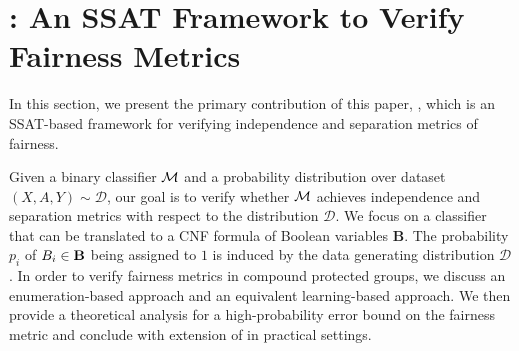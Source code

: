 \section{{\justicia}: An SSAT Framework to Verify Fairness Metrics}
\label{fairness_justicia_sec:framework}
In this section, we present the primary contribution of this paper, {\justicia}, which is an SSAT-based framework for verifying independence and separation metrics of fairness. 

Given a binary classifier $\alg$ and a probability distribution over dataset $(X,A,Y) \sim \mathcal{D} $, our goal is to verify whether $\alg$ achieves independence and separation metrics with respect to the distribution $\mathcal{D}$. We  focus on a classifier that can be translated to a CNF formula of Boolean variables $\mathbf{B} $. 
The probability $ p_i $ of $\bool_i \in \mathbf{B}$ being assigned to $1$ is induced by the data generating distribution $\mathcal{D}$. 
In order to verify fairness metrics in compound protected groups, we discuss an enumeration-based approach and an equivalent learning-based approach. 
We then provide a theoretical analysis for a high-probability error bound on the fairness metric and conclude with extension of {\justicia} in practical settings.

\iffalse
In this section, we present the main contribution of this paper, {\justicia}, which is an SSAT framework for verifying independence and separation metrics of fairness. 
We first state the problem formally in Section~\ref{fairness_justicia_sec:problem_statement}. 
To verify fairness metrics in compound protected groups, we discuss an enumeration approach in Section~\ref{fairness_justicia_sec:enumeration_ssat} and an equivalent but more efficient learning approach in Section~\ref{fairness_justicia_sec:learn_ssat}. 
We conclude this section by proposing a conditional distribution based enumeration for compound protected groups in Section~\ref{fairness_justicia_sec:cond_ssat}. 


\subsection{Problem Statement}
\label{fairness_justicia_sec:problem_statement}
Given a binary classifier $\alg$ and a probability distribution over dataset $(X,A,Y) \sim \mathcal{D} $, our goal is to verify whether $\alg$ achieves independence and separation metrics with respect to the distribution $\mathcal{D}$. We  focus on a classifier that can be translated to a CNF formula of Boolean variables $\mathbf{B} $. 
The probability $ p_i $ of $\bool_i \in \mathbf{B}$ being assigned to $1$ is induced by the data generating distribution $\mathcal{D}$. 
In our contribution, we reduce the verification problem to solving appropriately designed SSAT instances.
\fi 

